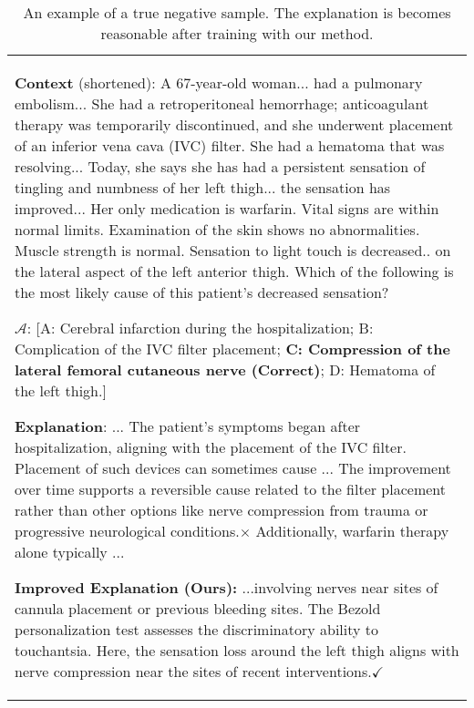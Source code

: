 \begin{table}[]
    \centering
    \caption{An example of a true negative sample. The explanation is becomes reasonable after training with our method.}
    \vspace{-1em}
    \begin{tabular}{p{1.0\linewidth}}
    \toprule
        \textbf{Context} (shortened): A 67-year-old woman... had a pulmonary embolism... She had a retroperitoneal hemorrhage; anticoagulant therapy was temporarily discontinued, and she underwent placement of an inferior vena cava (IVC) filter. She had a hematoma that was resolving... Today, she says she has had a persistent sensation of tingling and numbness of her left thigh... the sensation has improved... Her only medication is warfarin. Vital signs are within normal limits. Examination of the skin shows no abnormalities. Muscle strength is normal. Sensation to light touch is decreased.. on the lateral aspect of the left anterior thigh. Which of the following is the most likely cause of this patient's decreased sensation?
 
    $\bm{\mathcal{A}}$: [A: Cerebral infarction during the hospitalization; B: Complication of the IVC filter placement; \textbf{C: Compression of the lateral femoral cutaneous nerve {\color{red}(Correct)}}; D: Hematoma of the left thigh.]
    
    \textbf{Explanation}: ... The patient's symptoms began after hospitalization, aligning with the placement of the IVC filter. Placement of such devices can sometimes cause ... {\color{red}The improvement over time supports a reversible cause related to the filter placement rather than other options like nerve compression from trauma or progressive neurological conditions.$\boldsymbol{\times}$}  Additionally, warfarin therapy alone typically ... 

        \textbf{\textcolor{cotcolor}{Improved Explanation (Ours):}} ...involving nerves near sites of cannula placement or previous bleeding sites. The Bezold personalization test assesses the discriminatory ability to touchantsia. Here, the sensation loss around the left thigh \textcolor{outputcolor}{aligns with nerve compression near the sites of recent interventions.$\checkmark$} 
    \bottomrule
    \end{tabular}
    \label{tab:my_label}
\end{table}


    
    

